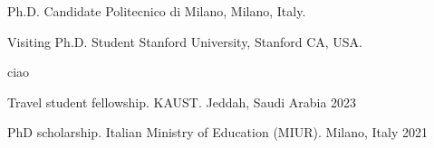 \documentclass{resume}
\newcommand{\polimi}{Politecnico di Milano}
\begin{document}




\begin{inline_entry}{Ph.D. Candidate}
   \polimi, Milano, Italy.
\end{inline_entry}

\begin{inline_entry}{Visiting Ph.D. Student}
   Stanford University, Stanford CA, USA.
\end{inline_entry}




ciao


\newpage




\newif\ifshowpubs
\showpubstrue %

\ifshowpubs

\else
\fi









\begin{inline_entry}{Travel student fellowship. KAUST.}
   Jeddah, Saudi Arabia \hfill 2023
\end{inline_entry}

\begin{inline_entry}{PhD scholarship. Italian Ministry of Education (MIUR).}
   Milano, Italy \hfill {2021}
\end{inline_entry}




\end{document}
